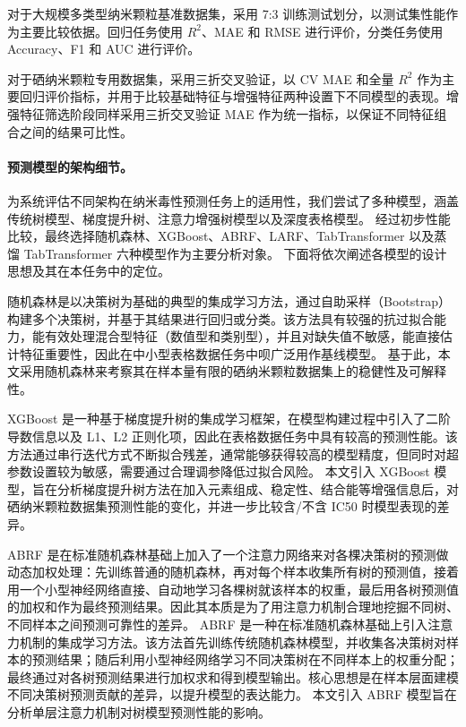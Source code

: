 \documentclass[letterpaper]{article}
\begin{document}
对于大规模多类型纳米颗粒基准数据集，采用 7:3 训练测试划分，以测试集性能作为主要比较依据。回归任务使用 $R^2$、MAE 和 RMSE 进行评价，分类任务使用 Accuracy、F1 和 AUC 进行评价。

对于硒纳米颗粒专用数据集，采用三折交叉验证，以 CV MAE 和全量 $R^2$ 作为主要回归评价指标，并用于比较基础特征与增强特征两种设置下不同模型的表现。增强特征筛选阶段同样采用三折交叉验证 MAE 作为统一指标，以保证不同特征组合之间的结果可比性。

\paragraph{预测模型的架构细节。}
为系统评估不同架构在纳米毒性预测任务上的适用性，我们尝试了多种模型，涵盖传统树模型、梯度提升树、注意力增强树模型以及深度表格模型。
经过初步性能比较，最终选择随机森林、XGBoost、ABRF、LARF、TabTransformer 以及蒸馏 TabTransformer 六种模型作为主要分析对象。
下面将依次阐述各模型的设计思想及其在本任务中的定位。

随机森林是以决策树为基础的典型的集成学习方法，通过自助采样（Bootstrap）构建多个决策树，并基于其结果进行回归或分类。该方法具有较强的抗过拟合能力，能有效处理混合型特征（数值型和类别型），并且对缺失值不敏感，能直接估计特征重要性，因此在中小型表格数据任务中呗广泛用作基线模型。
基于此，本文采用随机森林来考察其在样本量有限的硒纳米颗粒数据集上的稳健性及可解释性。


XGBoost 是一种基于梯度提升树的集成学习框架，在模型构建过程中引入了二阶导数信息以及 L1、L2 正则化项，因此在表格数据任务中具有较高的预测性能。该方法通过串行迭代方式不断拟合残差，通常能够获得较高的模型精度，但同时对超参数设置较为敏感，需要通过合理调参降低过拟合风险。
本文引入 XGBoost 模型，旨在分析梯度提升树方法在加入元素组成、稳定性、结合能等增强信息后，对硒纳米颗粒数据集预测性能的变化，并进一步比较含/不含 IC50 时模型表现的差异。

ABRF 是在标准随机森林基础上加入了一个注意力网络来对各棵决策树的预测做动态加权处理：先训练普通的随机森林，再对每个样本收集所有树的预测值，接着用一个小型神经网络直接、自动地学习各棵树就该样本的权重，最后用各树预测值的加权和作为最终预测结果。因此其本质是为了用注意力机制合理地挖掘不同树、不同样本之间预测可靠性的差异。
ABRF 是一种在标准随机森林基础上引入注意力机制的集成学习方法。该方法首先训练传统随机森林模型，并收集各决策树对样本的预测结果；随后利用小型神经网络学习不同决策树在不同样本上的权重分配；最终通过对各树预测结果进行加权求和得到模型输出。核心思想是在样本层面建模不同决策树预测贡献的差异，以提升模型的表达能力。
本文引入 ABRF 模型旨在分析单层注意力机制对树模型预测性能的影响。
\end{document}
